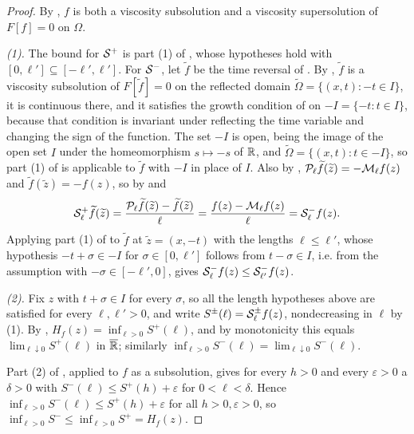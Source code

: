 \begin{proof}
By , $f$ is both a viscosity subsolution and a
viscosity supersolution of $F[f]=0$ on $\Omega$.

\emph{(1).} The bound for $\mathcal{S}^+$ is part (1) of ,
whose hypotheses hold with $[0,\ell']\subseteq[-\ell',\ell']$. For
$\mathcal{S}^-$, let $\widetilde f$ be the time reversal of . By
, $\widetilde f$ is a viscosity subsolution of
$F[\widetilde f]=0$ on the reflected domain $\widetilde\Omega=\{(x,t):-t\in I\}$,
it is continuous there, and it satisfies the growth condition of
 on $-I=\{-t:t\in I\}$, because that condition is
invariant under reflecting the time variable and changing the sign of the
function. The set $-I$ is open, being the image of the open set $I$ under the
homeomorphism $s\mapsto-s$ of $\mathbb{R}$, and $\widetilde\Omega=\{(x,t):t\in-I\}$, so
part (1) of  is applicable to $\widetilde f$ with
$-I$ in place of $I$. Also by ,
$\mathcal{P}_\ell\widetilde f(\widetilde z)=-\mathcal{M}_\ell f(z)$ and
$\widetilde f(\widetilde z)=-f(z)$, so by  and
\[
  \mathcal{S}_\ell^+\widetilde f(\widetilde z)
   =\frac{\mathcal{P}_\ell\widetilde f(\widetilde z)-\widetilde f(\widetilde z)}{\ell}
   =\frac{f(z)-\mathcal{M}_\ell f(z)}{\ell}=\mathcal{S}_\ell^-f(z).
\]
Applying part (1) of  to $\widetilde f$ at
$\widetilde z=(x,-t)$ with the lengths $\ell\le\ell'$, whose hypothesis
$-t+\sigma\in-I$ for $\sigma\in[0,\ell']$ follows from $t-\sigma\in I$, i.e.
from the assumption with $-\sigma\in[-\ell',0]$, gives
$\mathcal{S}_\ell^-f(z)\le\mathcal{S}_{\ell'}^-f(z)$.

\emph{(2).} Fix $z$ with $t+\sigma\in I$ for every $\sigma$, so all the length
hypotheses above are satisfied for every $\ell,\ell'>0$, and write
$S^\pm(\ell)=\mathcal{S}_\ell^\pm f(z)$, nondecreasing in $\ell$ by (1). By
, $H_f(z)=\inf_{\ell>0}S^+(\ell)$, and by monotonicity
this equals $\lim_{\ell\downarrow0}S^+(\ell)$ in $\overline{\mathbb{R}}$; similarly
$\inf_{\ell>0}S^-(\ell)=\lim_{\ell\downarrow0}S^-(\ell)$.

Part (2) of , applied to $f$ as a subsolution, gives
for every $h>0$ and every $\varepsilon>0$ a $\delta>0$ with
$S^-(\ell)\le S^+(h)+\varepsilon$ for $0<\ell<\delta$. Hence
$\inf_{\ell>0}S^-(\ell)\le S^+(h)+\varepsilon$ for all $h>0,\varepsilon>0$, so
$\inf_{\ell>0}S^-\le\inf_{\ell>0}S^+=H_f(z)$.


\end{proof}
